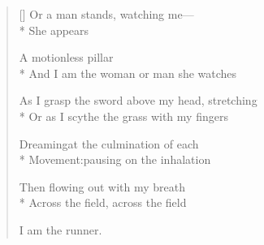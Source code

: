 \begin{verse}[\versewidth]
Or a man stands, watching me---\\*
She appears

A motionless pillar\\*
And I am the woman or man she watches

As I grasp the sword above my head, stretching\\*
Or as I scythe the grass with my fingers

Dreaming\quad at the culmination of each\\*
Movement:\quad pausing on the inhalation

Then flowing out with my breath\\*
Across the field, across the field

I am the runner.
\end{verse}
